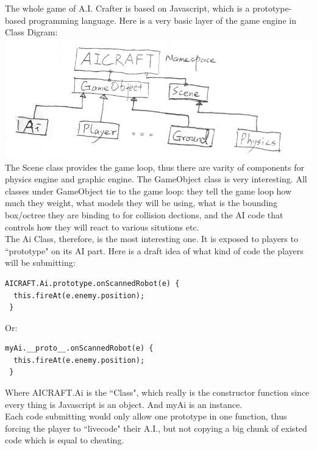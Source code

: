 \documentclass[12pt]{article}
\begin{document}
The whole game of A.I. Crafter is based on Javascript, which is a prototype-based programming language. Here is a very basic layer of the game engine in Class Digram:\\

\includegraphics[scale=0.4]{uml.jpg}\\

The Scene class provides the game loop, thus there are varity of components for physics engine and graphic engine. The GameObject class is very interesting. All classes under GameObject tie to the game loop: they tell the game loop how much they weight, what models they will be using, what is the bounding box/octree they are binding to for collision dections, and the AI code that controls how they will react to various situtions etc.\\

The Ai Class, therefore, is the most interesting one. It is exposed to players to ``prototype" on its AI part. Here is a draft idea of what kind of code the players will be submitting:

\begin{verbatim}
AICRAFT.Ai.prototype.onScannedRobot(e) {
  this.fireAt(e.enemy.position);
 }
\end{verbatim}

Or:

\begin{verbatim}
myAi.__proto__.onScannedRobot(e) {
  this.fireAt(e.enemy.position);
 }
\end{verbatim}

Where AICRAFT.Ai is the ``Class", which really is the constructor function since every thing is Javascript is an object. And myAi is an instance.\\

Each code submitting would only allow one prototype in one function, thus forcing the player to ``livecode" their A.I., but not copying a big chunk of existed code which is equal to cheating.\\
\end{document}
